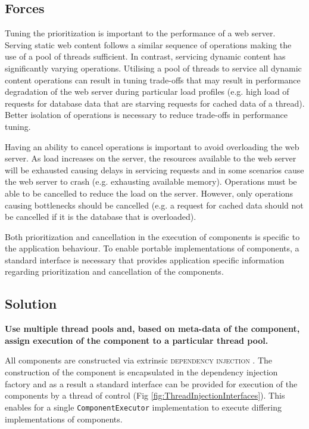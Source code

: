 \documentclass[prodmode]{style/acmlarge}
\begin{document}
\subsection{Forces}

Tuning the prioritization is important to the performance of a web server.
Serving static web content follows a similar sequence of operations making the
use of a pool of threads sufficient.  In contrast, servicing dynamic content has
significantly varying operations.  Utilising a pool of threads to service all
dynamic content operations can result in tuning trade-offs that may result in
performance degradation of the web server during particular load profiles (e.g.
high load of requests for database data that are starving requests for cached
data of a thread).  Better isolation of operations is necessary to reduce
trade-offs in performance tuning.

Having an ability to cancel operations is important to avoid overloading the web
server.  As load increases on the server, the resources available to the web
server will be exhausted causing delays in servicing requests and in some
scenarios cause the web server to crash (e.g. exhausting available memory). 
Operations must be able to be cancelled to reduce the load on the server. 
However, only operations causing bottlenecks should be cancelled (e.g. a request
for cached data should not be cancelled if it is the database that is
overloaded).

Both prioritization and cancellation in the execution of components is specific
to the application behaviour.  To enable portable implementations of components,
a standard interface is necessary that provides application specific information
regarding prioritization and cancellation of the components.


\subsection{Solution}

\textbf{Use multiple thread pools and, based on meta-data of the component, assign execution of the component to a particular thread pool.}

All components are constructed via extrinsic \textsc{dependency injection}
\cite{ioc}.  The construction of the component is encapsulated in the dependency
injection factory and as a result a standard interface can be provided for
execution of the components by a thread of control (Fig
\ref{fig:ThreadInjectionInterfaces}).  This enables for a single
\texttt{ComponentExecutor} implementation to execute differing implementations
of components.
\end{document}
